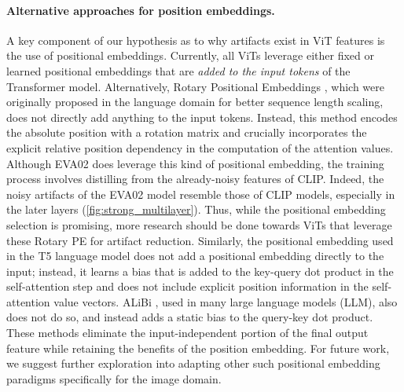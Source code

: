 \paragraph{Alternative approaches for position embeddings.} A key component of our hypothesis as to why artifacts exist in ViT features is the use of positional embeddings. Currently, all ViTs leverage either fixed \cite{he2022masked} or learned \cite{Caron_2021, oquab2023dinov2, touvron2022deit} positional embeddings that are \textit{added to the input tokens} of the Transformer model.
Alternatively, Rotary Positional Embeddings \cite{su2023roformer}, which were originally proposed in the language domain for better sequence length scaling, does not directly add anything to the input tokens. Instead, this method encodes the absolute position with a rotation matrix and crucially incorporates the explicit relative position dependency in the computation of the attention values.
Although EVA02 \cite{fang2023eva} does leverage this kind of positional embedding, the training process involves distilling from the already-noisy features of CLIP. Indeed, the noisy artifacts of the EVA02 model resemble those of CLIP models, especially in the later layers (\cref{fig:strong_multilayer}).
Thus, while the positional embedding selection is promising, more research should be done towards ViTs that leverage these Rotary PE for artifact reduction.
Similarly, the positional embedding used in the T5 language model \cite{raffel2023exploring} does not add a positional embedding directly to the input; instead, it learns a bias that is added to the key-query dot product in the self-attention step and does not include explicit position information in the self-attention value vectors. ALiBi \cite{press2022train}, used in many large language models (LLM), also does not do so, and instead adds a static bias to the query-key dot product. These methods eliminate the input-independent portion of the final output feature while retaining the benefits of the position embedding. For future work, we suggest further exploration into adapting other such positional embedding paradigms specifically for the image domain.


